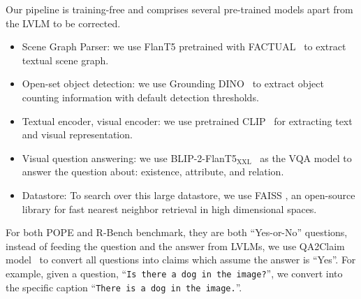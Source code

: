 Our pipeline is training-free and comprises several pre-trained models apart from the LVLM to be corrected. 

\begin{itemize}[leftmargin=*]
    \item Scene Graph Parser: we use FlanT5 pretrained with FACTUAL~\cite{li-etal-2023-factual} to extract textual scene graph.
    \item Open-set object detection: we use Grounding DINO~\cite{liu2023grounding} to extract object counting information with default detection thresholds.
    \item Textual encoder, visual encoder: we use pretrained CLIP~\cite{radford2021learningtransferablevisualmodels} for extracting text and visual representation.
    \item Visual question answering: we use BLIP-2-FlanT5$_\text{XXL}$~\cite{li2023blip} as the VQA model to answer the question about: existence, attribute, and relation.
    \item Datastore: To search over this large datastore, we use FAISS \cite{johnson2017billion}, an open-source library for fast nearest neighbor retrieval in high dimensional spaces.
\end{itemize}

For both POPE and R-Bench benchmark, they are both ``Yes-or-No'' questions, instead of feeding the question and the answer from LVLMs, we use QA2Claim model~\cite{huang-etal-2023-zero} to convert all questions into claims which assume the answer is ``Yes''. For example, given a question, ``\texttt{Is there a dog in the image?}'', we convert into the specific caption ``\texttt{There is a dog in the image.}''.



